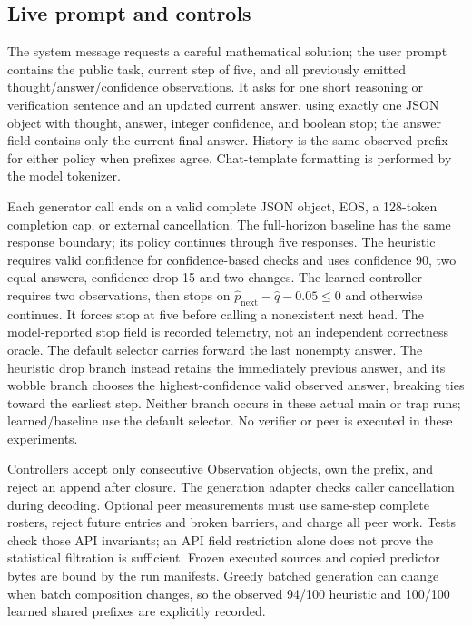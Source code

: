 \subsection{Live prompt and controls}
The system message requests a careful mathematical solution; the user prompt
contains the public task, current step of five, and all previously emitted
thought/answer/confidence observations. It asks for one short reasoning or
verification sentence and an updated current answer, using exactly one JSON
object with thought, answer, integer confidence, and boolean stop; the answer
field contains only the current final answer. History is the same observed
prefix for either policy when prefixes agree. Chat-template formatting is
performed by the model tokenizer.

Each generator call ends on a valid complete JSON object, EOS, a 128-token
completion cap, or external cancellation. The full-horizon baseline has the
same response boundary; its policy continues through five responses.
The heuristic requires valid confidence for confidence-based checks and uses
confidence 90, two equal answers, confidence drop 15 and two changes.
The learned controller requires two observations, then stops on
\(\widehat p_{\mathrm{next}}-\widehat q-0.05\le0\) and otherwise continues.
It forces stop at five before calling a nonexistent next head.
The model-reported stop field is recorded telemetry, not an independent
correctness oracle. The default selector carries forward the last nonempty
answer. The heuristic drop branch instead retains the immediately previous
answer, and its wobble branch chooses the highest-confidence valid observed
answer, breaking ties toward the earliest step. Neither branch occurs in
these actual main or trap runs; learned/baseline use the default selector.
No verifier or peer is executed in these experiments.

Controllers accept only consecutive Observation objects, own the prefix,
and reject an append after closure. The generation adapter checks caller
cancellation during decoding.
Optional peer measurements must use same-step complete rosters, reject future
entries and broken barriers, and charge all peer work. Tests check those API
invariants; an API field restriction alone does not prove the statistical
filtration is sufficient. Frozen executed sources and copied predictor bytes
are bound by the run manifests. Greedy batched generation can change when
batch composition changes, so the observed 94/100 heuristic and 100/100
learned shared prefixes are explicitly recorded.

